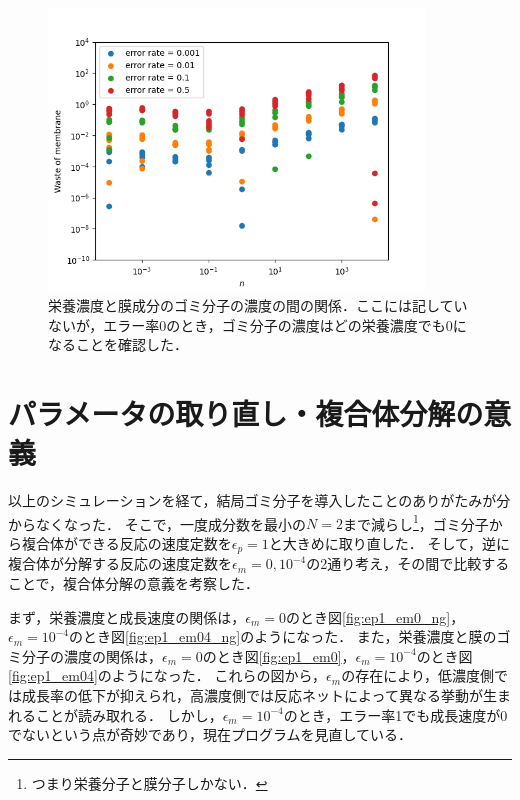 \documentclass[a4paper,11pt]{jsarticle}
\begin{document}
\begin{figure}[htbp]
  \centering
  \includegraphics[width=10cm]{waste_N5_T5_p08_err_wom.png}
  \caption{栄養濃度と膜成分のゴミ分子の濃度の間の関係．ここには記していないが，エラー率0のとき，ゴミ分子の濃度はどの栄養濃度でも0になることを確認した．}
  \label{fig:nwom_p08_err}
\end{figure}

\section{パラメータの取り直し・複合体分解の意義}
以上のシミュレーションを経て，結局ゴミ分子を導入したことのありがたみが分からなくなった．
そこで，一度成分数を最小の$N=2$まで減らし\footnote{つまり栄養分子と膜分子しかない．}，ゴミ分子から複合体ができる反応の速度定数を$\epsilon_p=1$と大きめに取り直した．
そして，逆に複合体が分解する反応の速度定数を$\epsilon_m=0,10^{-4}$の2通り考え，その間で比較することで，複合体分解の意義を考察した．

まず，栄養濃度と成長速度の関係は，$\epsilon_m=0$のとき図\ref{fig:ep1_em0_ng}，$\epsilon_m=10^{-4}$のとき図\ref{fig:ep1_em04_ng}のようになった．
また，栄養濃度と膜のゴミ分子の濃度の関係は，$\epsilon_m=0$のとき図\ref{fig:ep1_em0}，$\epsilon_m=10^{-4}$のとき図\ref{fig:ep1_em04}のようになった．
これらの図から，$\epsilon_m$の存在により，低濃度側では成長率の低下が抑えられ，高濃度側では反応ネットによって異なる挙動が生まれることが読み取れる．
しかし，$\epsilon_m=10^{-4}$のとき，エラー率1でも成長速度が0でないという点が奇妙であり，現在プログラムを見直している．
\end{document}

